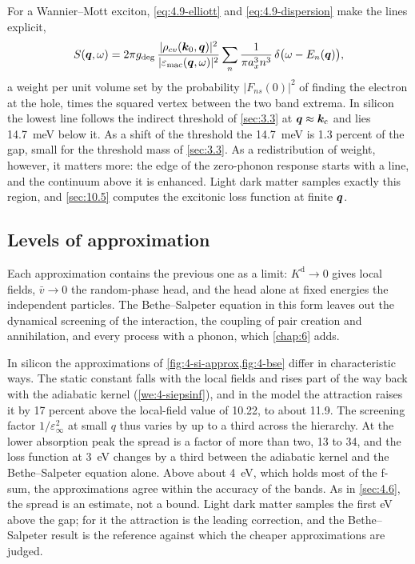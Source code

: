 For a Wannier--Mott exciton, \cref{eq:4.9-elliott} and \cref{eq:4.9-dispersion} make the lines explicit,
\begin{equation*}
  S(\bm{q},\omega) = 2\pi g_{\mathrm{deg}}\,\frac{|\rho_{cv}(\bm{k}_0,\bm{q})|^2}{|\varepsilon_{\mathrm{mac}}(\bm{q},\omega)|^2}\sum_n\frac{1}{\pi a_x^3n^3}\,\delta\bigl(\omega - E_n(\bm{q})\bigr) ,
\end{equation*}
a weight per unit volume set by the probability $|F_{ns}(0)|^2$ of finding the electron at the hole, times the squared vertex between the two band extrema. In silicon the lowest line follows the indirect threshold of \cref{sec:3.3} at $\bm{q} \approx \bm{k}_{\mathrm{c}}$ and lies \SI{14.7}{meV} below it. As a shift of the threshold the \SI{14.7}{meV} is 1.3 percent of the gap, small for the threshold mass of \cref{sec:3.3}. As a redistribution of weight, however, it matters more: the edge of the zero-phonon response starts with a line, and the continuum above it is enhanced. Light dark matter samples exactly this region, and \cref{sec:10.5} computes the excitonic loss function at finite $\bm{q}$.

\subsection{Levels of approximation}

Each approximation contains the previous one as a limit: $K^{\mathrm{d}} \to 0$ gives local fields, $\bar v \to 0$ the random-phase head, and the head alone at fixed energies the independent particles. The Bethe--Salpeter equation in this form leaves out the dynamical screening of the interaction, the coupling of pair creation and annihilation, and every process with a phonon, which \cref{chap:6} adds.

In silicon the approximations of \cref{fig:4-si-approx,fig:4-bse} differ in characteristic ways. The static constant falls with the local fields and rises part of the way back with the adiabatic kernel (\cref{we:4-siepsinf}), and in the model the attraction raises it by 17 percent above the local-field value of 10.22, to about 11.9. The screening factor $1/\varepsilon_\infty^2$ at small $q$ thus varies by up to a third across the hierarchy. At the lower absorption peak the spread is a factor of more than two, 13 to 34, and the loss function at \SI{3}{eV} changes by a third between the adiabatic kernel and the Bethe--Salpeter equation alone. Above about \SI{4}{eV}, which holds most of the f-sum, the approximations agree within the accuracy of the bands. As in \cref{sec:4.6}, the spread is an estimate, not a bound. Light dark matter samples the first eV above the gap; for it the attraction is the leading correction, and the Bethe--Salpeter result is the reference against which the cheaper approximations are judged.

